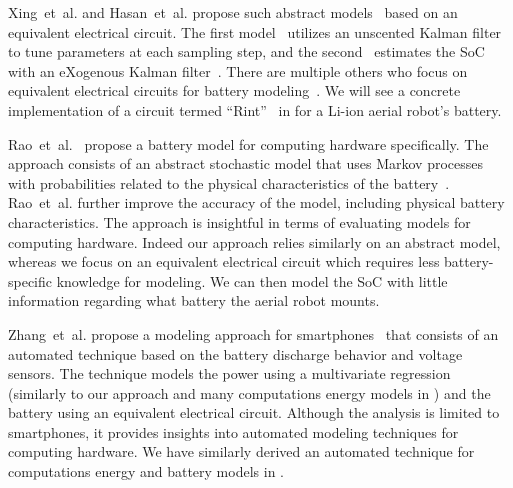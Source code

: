 Xing~et~al. and Hasan~et~al. propose such abstract models~\citep{xing2014state,hasan2018exogenous} based on an equivalent electrical circuit. The first model~\citep{xing2014state} utilizes an unscented Kalman filter to tune parameters at each sampling step, and the second~\citep{hasan2018exogenous} estimates the SoC with an eXogenous Kalman filter~\citep{johansen2017exogenous}. 
There are multiple others who focus on equivalent electrical circuits for battery modeling~\citep{zhang2018online,zhang2012estimation,zhang2009battery,saeed2019electrical,mousavi2014various,hinz2019comparison,he2011evaluation}. We will see a concrete implementation of a circuit termed ``Rint''~\citep{mousavi2014various,hinz2019comparison,he2011evaluation} in  for a Li-ion aerial robot's battery.

Rao~et~al.~\citep{rao2005battery} propose a battery model for computing hardware specifically. The approach consists of an abstract stochastic model that uses Markov processes with probabilities related to the physical characteristics of the battery~\citep{panigrahi2001battery}. Rao~et~al. further improve the accuracy of the model, including physical battery characteristics. The approach is insightful in terms of evaluating models for computing hardware. Indeed our approach relies similarly on an abstract model, whereas we focus on an equivalent electrical circuit which requires less battery-specific knowledge for modeling. We can then model the SoC with little information regarding what battery the aerial robot mounts.

Zhang~et~al. propose a modeling approach for smartphones~\citep{zhang2010accurate} that consists of an automated technique based on the battery discharge behavior and voltage sensors. The technique models the power using a multivariate regression (similarly to our approach and many computations energy models in ) and the battery using an equivalent electrical circuit. Although the analysis is limited to smartphones, it provides insights into automated modeling techniques for computing hardware. We have similarly derived an automated technique for computations energy and battery models in .

